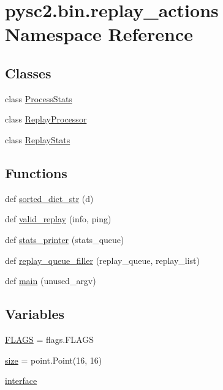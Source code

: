 \hypertarget{namespacepysc2_1_1bin_1_1replay__actions}{}\section{pysc2.\+bin.\+replay\+\_\+actions Namespace Reference}
\label{namespacepysc2_1_1bin_1_1replay__actions}
\subsection*{Classes}
\begin{DoxyCompactItemize}
\item 
class \mbox{\hyperlink{classpysc2_1_1bin_1_1replay__actions_1_1_process_stats}{Process\+Stats}}
\item 
class \mbox{\hyperlink{classpysc2_1_1bin_1_1replay__actions_1_1_replay_processor}{Replay\+Processor}}
\item 
class \mbox{\hyperlink{classpysc2_1_1bin_1_1replay__actions_1_1_replay_stats}{Replay\+Stats}}
\end{DoxyCompactItemize}
\subsection*{Functions}
\begin{DoxyCompactItemize}
\item 
def \mbox{\hyperlink{namespacepysc2_1_1bin_1_1replay__actions_ab484faf8c35388d9fcf8b72cb02ef6a6}{sorted\+\_\+dict\+\_\+str}} (d)
\item 
def \mbox{\hyperlink{namespacepysc2_1_1bin_1_1replay__actions_aae5d5407eba33910938aa3a851836a0c}{valid\+\_\+replay}} (info, ping)
\item 
def \mbox{\hyperlink{namespacepysc2_1_1bin_1_1replay__actions_a1193b2acf3514b1b6e766a66ba50b8cb}{stats\+\_\+printer}} (stats\+\_\+queue)
\item 
def \mbox{\hyperlink{namespacepysc2_1_1bin_1_1replay__actions_a2d0b55d645d0906bf8af148c7fff86dc}{replay\+\_\+queue\+\_\+filler}} (replay\+\_\+queue, replay\+\_\+list)
\item 
def \mbox{\hyperlink{namespacepysc2_1_1bin_1_1replay__actions_a6d919b81161cbb5230b4f4fcdea2e465}{main}} (unused\+\_\+argv)
\end{DoxyCompactItemize}
\subsection*{Variables}
\begin{DoxyCompactItemize}
\item 
\mbox{\hyperlink{namespacepysc2_1_1bin_1_1replay__actions_a1a549256e121c8c750ee834e58fc3eae}{F\+L\+A\+GS}} = flags.\+F\+L\+A\+GS
\item 
\mbox{\hyperlink{namespacepysc2_1_1bin_1_1replay__actions_abe4e72943d72eb48de33710405cbde7c}{size}} = point.\+Point(16, 16)
\item 
\mbox{\hyperlink{namespacepysc2_1_1bin_1_1replay__actions_aef1e28f8981f99f5f95ab179996427db}{interface}}
\end{DoxyCompactItemize}


